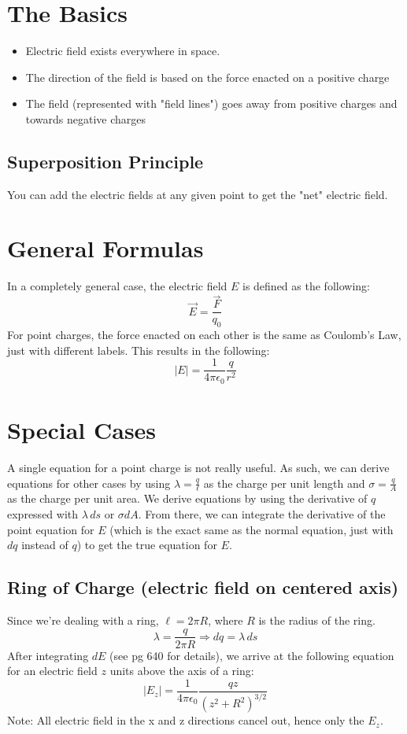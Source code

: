 \documentclass[]{article}
\begin{document}
\section{The Basics}
\begin{itemize}
  \item Electric field exists everywhere in space.
  \item The direction of the field is based on the force enacted on a positive charge
  \item The field (represented with "field lines") goes away from positive charges and towards negative charges
\end{itemize}
\subsection{Superposition Principle}
You can add the electric fields at any given point to get the "net" electric field.
\section{General Formulas}
In a completely general case, the electric field $ E $ is defined as the following:
\[ \vec{E} = \frac{\vec{F}}{q_{0}} \]
For point charges, the force enacted on each other is the same as Coulomb's Law, just with different labels. This results in the following:
\[ |E| = \frac{1}{4\pi\epsilon_0}\frac{q}{r^2} \]
\section{Special Cases}
A single equation for a point charge is not really useful. As such, we can derive equations for other cases by using $ \lambda = \frac{q}{\ell} $ as the charge per unit length and $ \sigma = \frac{q}{A} $ as the charge per unit area.
We derive equations by using the derivative of $ q $ expressed with $ \lambda \,ds $ or $ \sigma dA $. From there, we can integrate the derivative of the point equation for $ E $ (which is the exact same as the normal equation, just with $ dq $ instead of $ q $) to get the true equation for $ E $.
\subsection{Ring of Charge (electric field on centered axis)}
Since we're dealing with a ring, $ \ell = 2 \pi R $, where $ R $ is the radius of the ring.
\[ \lambda = \frac{q}{2 \pi R} \Rightarrow dq = \lambda \,ds \]
After integrating $ dE $ (see pg 640 for details), we arrive at the following equation for an electric field $ z $ units above the axis of a ring:
\[ |E_z| = \frac{1}{4 \pi \epsilon_0} \frac{q z}{(z^2 + R^2)^{3/2}} \]
Note: All electric field in the x and z directions cancel out, hence only the $ E_z $.
\end{document}
